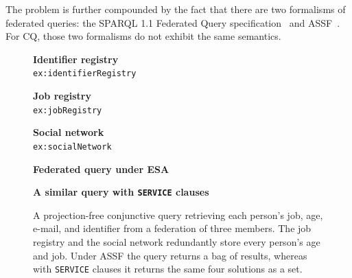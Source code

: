 The problem is further compounded by the fact that there are two formalisms of federated queries: the SPARQL 1.1 Federated Query specification~\cite{w3SPARQLFederated} and \ac{ASSF}~\cite{Cheng2021}.
For \ac{CQ}, those two formalisms do not exhibit the same semantics.

\begin{figure}
  \begin{minipage}{0.20\textwidth}
    \textbf{Identifier registry}\\
    \texttt{\scriptsize ex:identifierRegistry}
    
  \end{minipage}\hfill
  \begin{minipage}{0.36\textwidth}
    \textbf{Job registry}\\
    \texttt{\scriptsize ex:jobRegistry}
    
  \end{minipage}\hfill
  \begin{minipage}{0.42\textwidth}
    \textbf{Social network}\\
    \texttt{\scriptsize ex:socialNetwork}
    
  \end{minipage}

  \medskip

  \begin{minipage}{0.48\textwidth}
    \textbf{Federated query under ESA}
    
  \end{minipage}\hfill
  \begin{minipage}{0.48\textwidth}
    \textbf{A similar query with \texttt{SERVICE} clauses}
    
  \end{minipage}

  \caption{A projection-free conjunctive query retrieving each person's job, age, e-mail, and identifier from a federation of three members.
  The job registry and the social network redundantly store every person's age and job.
  Under \ac{ASSF} the query returns a bag of results, whereas with \texttt{SERVICE} clauses it returns the same four solutions as a set.}
  \label{fig:bag-federation-example}
\end{figure}

